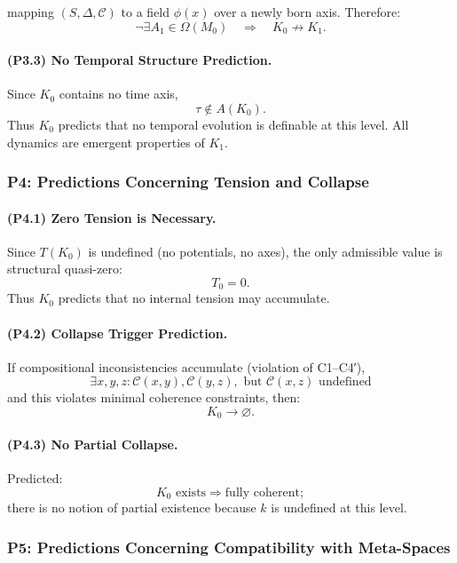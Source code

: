 mapping $(S,\Delta,\mathcal{C})$ to a field $\phi(x)$ over a newly born axis.
Therefore:
\[
\neg\exists A_1 \in \Omega(M_0)
\quad\Rightarrow\quad
K_0 \not\to K_1.
\]

\paragraph{(P3.3) No Temporal Structure Prediction.}
Since $K_0$ contains no time axis,
\[
\tau \notin A(K_0).
\]
Thus $K_0$ predicts that no temporal evolution is definable at this level.
All dynamics are emergent properties of $K_1$.

\subsubsection{P4: Predictions Concerning Tension and Collapse}

\paragraph{(P4.1) Zero Tension is Necessary.}
Since $T(K_0)$ is undefined (no potentials, no axes),
the only admissible value is structural quasi-zero:
\[
T_0 = 0.
\]
Thus $K_0$ predicts that no internal tension may accumulate.

\paragraph{(P4.2) Collapse Trigger Prediction.}
If compositional inconsistencies accumulate (violation of C1–C4′),
\[
\exists x,y,z: \mathcal{C}(x,y), \mathcal{C}(y,z), \text{ but } \mathcal{C}(x,z) \text{ undefined}
\]
and this violates minimal coherence constraints, then:
\[
K_0 \to \varnothing.
\]

\paragraph{(P4.3) No Partial Collapse.}
Predicted:
\[
K_0 \text{ exists} \Rightarrow \text{fully coherent};
\]
there is no notion of partial existence because $k$ is undefined at this level.

\subsubsection{P5: Predictions Concerning Compatibility with Meta-Spaces}

